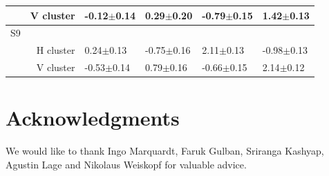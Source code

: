 \begin{table}[htbp!]
\begin{tabular}{lrllll}
    & V cluster      &   -0.12$\pm$0.14 & { }0.29$\pm$0.20 &   -0.79$\pm$0.15 & { }1.42$\pm$0.13 \\
\hline
S9  &                &                  &                  &                  &                  \\
    & H cluster      & { }0.24$\pm$0.13 &   -0.75$\pm$0.16 & { }2.11$\pm$0.13 &   -0.98$\pm$0.13 \\
    & V cluster      &   -0.53$\pm$0.14 & { }0.79$\pm$0.16 &   -0.66$\pm$0.15 & { }2.14$\pm$0.12 \\
\bottomrule
\end{tabular}
\label{tab:modulations}
\end{table}

\clearpage
\section{Acknowledgments}
We would like to thank Ingo Marquardt, Faruk Gulban, Sriranga Kashyap, Agustin Lage and Nikolaus Weiskopf for valuable advice.

\stopsupplement
\clearpage
\printbibliography[heading=subbibnumbered, title={References}]